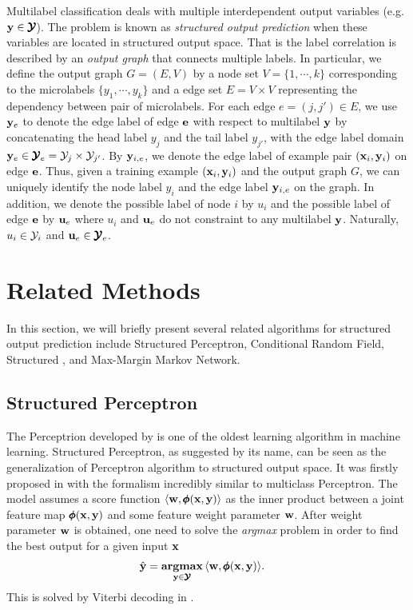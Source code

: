 {Multilabel classification deals with multiple interdependent output variables (e.g. $\mathbf {y}\in\pmb {\mathcal{Y}}$).
The problem is known as \textit{structured output prediction} when these variables are located in structured output space.
That is the label correlation is described by an \textit{output graph} that connects multiple labels.
In particular, we define the output graph $G=(E,V)$ by a node set $V=\{1,\cdots,k\}$ corresponding to the microlabels $\{y_1,\cdots,y_k\}$ and a edge set $E=V\times V$ representing the dependency between pair of microlabels.
For each edge $e=(j,j')\in E$, we use $\mathbf {y}_e$ to denote the edge label of edge $\mathbf {e}$ with respect to multilabel $\mathbf {y}$ by concatenating the head label $y_j$ and the tail label $y_{j'}$, with the edge label domain $\mathbf {y}_e\in\pmb {\mathcal{Y}}_e=\mathcal{Y}_j\times\mathcal{Y}_{j'}$.
By $\mathbf {y}_{i,e}$, we denote the edge label of example pair $(\mathbf {x}_i,\mathbf {y}_i)$ on edge $\mathbf {e}$.
Thus, given a training example $(\mathbf {x}_i,\mathbf {y}_i)$ and the output graph $G$, we can uniquely identify the node label $y_i$ and the edge label $\mathbf {y}_{i,e}$ on the graph.
In addition, we denote the possible label of node $i$ by $u_i$ and the possible label of edge $\mathbf {e}$ by $\mathbf {u}_{e}$ where $u_i$ and $\mathbf {u}_{e}$ do not constraint to any multilabel $\mathbf {y}$.
Naturally, $u_i\in\mathcal{Y}_i$ and $\mathbf {u}_e\in\pmb {\mathcal{Y}}_e$.



%
%
\section{Related Methods}

In this section, we will briefly present several related algorithms for structured output prediction include Structured Perceptron, Conditional Random Field, Structured \svm, and Max-Margin Markov Network.



%
%
\subsection{Structured Perceptron}

The Perceptrion developed by \citet{Rosenblatt58} is one of the oldest learning algorithm in machine learning.
Structured Perceptron, as suggested by its name, can be seen as the generalization of Perceptron algorithm to structured output space.
It was firstly proposed in \citep{collins02a, collins02b} with the formalism incredibly similar to multiclass Perceptron. 
The model assumes a score function $\langle \mathbf {w}, \pmb \phi(\mathbf {x},\mathbf {y}) \rangle$ as the inner product between a joint feature map $\pmb \phi(\mathbf {x},\mathbf {y})$ and some feature weight parameter $\mathbf {w}$.
After weight parameter $\mathbf {w}$ is obtained, one need to solve the \textit{argmax} problem in order to find the best output for a given input $\mathbf {x}$
\begin{align}
	\hat{\mathbf {y}} = \underset{\mathbf {y}\in\pmb {\mathcal{Y}}}{\textbf{argmax}} &\, \langle \mathbf {w}, \pmb \phi(\mathbf {x},\mathbf {y}) \rangle.  \label{sp_inference}
\end{align}
This is solved by Viterbi decoding in \citep{collins02a}.

}
